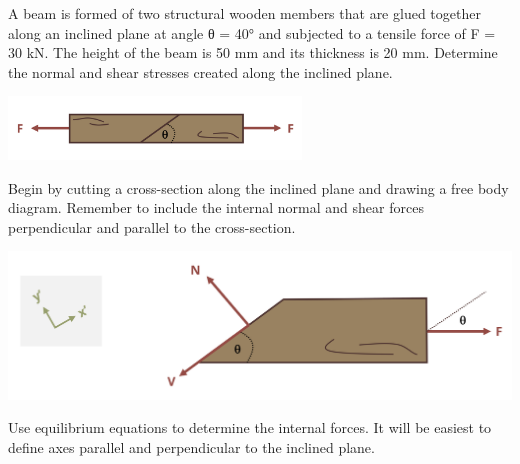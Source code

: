 \documentclass[
  letterpaper,
  DIV=11,
  numbers=noendperiod]{scrreprt}
\theoremstyle{definition}
\theoremstyle{remark}
\begin{document}
\begin{tcolorbox}[enhanced jigsaw, leftrule=.75mm, colbacktitle=quarto-callout-tip-color!10!white, breakable, opacityback=0, colback=white, titlerule=0mm, toprule=.15mm, colframe=quarto-callout-tip-color-frame, coltitle=black, title={Example 2.5}, toptitle=1mm, bottomrule=.15mm, rightrule=.15mm, left=2mm, arc=.35mm, opacitybacktitle=0.6, bottomtitle=1mm]

A beam is formed of two structural wooden members that are glued
together along an inclined plane at angle θ = 40° and subjected to a
tensile force of F = 30 kN. The height of the beam is 50 mm and its
thickness is 20 mm. Determine the normal and shear stresses created
along the inclined plane.

\begin{center}
\includegraphics[width=3.0625in,height=\textheight]{images/CH2 figures/example 2.5 part 1.png}
\end{center}

\begin{tcolorbox}[enhanced jigsaw, leftrule=.75mm, colbacktitle=quarto-callout-tip-color!10!white, breakable, opacityback=0, colback=white, titlerule=0mm, toprule=.15mm, colframe=quarto-callout-tip-color-frame, coltitle=black, title={Solution}, toptitle=1mm, bottomrule=.15mm, rightrule=.15mm, left=2mm, arc=.35mm, opacitybacktitle=0.6, bottomtitle=1mm]

Begin by cutting a cross-section along the inclined plane and drawing a
free body diagram. Remember to include the internal normal and shear
forces perpendicular and parallel to the cross-section.

\begin{center}
\includegraphics{images/CH2 figures/example 2.5 part 1 copy.png}
\end{center}

Use equilibrium equations to determine the internal forces. It will be
easiest to define axes parallel and perpendicular to the inclined plane.


\end{tcolorbox}
\end{tcolorbox}
\end{document}
